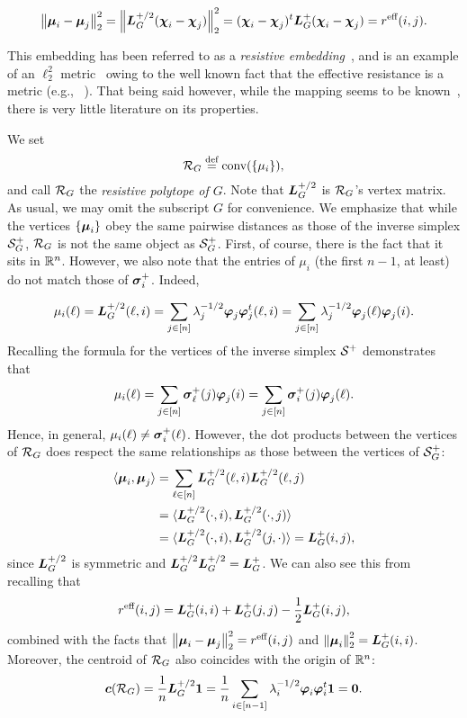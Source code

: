 \begin{equation*}
\norm{\vb*{\mu}_i-\vb*{\mu}_j}_2^2 = \norm{\vb*{L}_G^{+/2}(\boldsymbol{\chi}_i-\boldsymbol{\chi}_j)}_2^2 =  (\boldsymbol{\chi}_i-\boldsymbol{\chi}_j)^t \vb*{L}_G^+(\boldsymbol{\chi}_i-\boldsymbol{\chi}_j)=r^{\textnormal{eff}}(i,j).
\end{equation*}

This embedding has been referred to as a \emph{resistive embedding}~\cite{shayanNotes,ding2011cover}, and is an example of an $\ell_2^2$ metric~\cite{arora2009expander} owing  to the well known fact that the effective resistance is a metric (e.g., ~\cite{klein1993resistance}). That being said however, while the mapping seems to be known~\cite{ghosh2008minimizing}, there is very little literature on its properties. 

We  set 
\begin{equation}
\label{eq:res_pol}
\mathcal{R}_G \overset{\text{def}}{=} \textnormal{conv}(\{\mu_i\}),
\end{equation}
and  call  $\mathcal{R}_G$ the \emph{resistive polytope of $G$}. Note that $\vb*{L}_G^{+/2}$ is $\mathcal{R}_G$'s vertex matrix. As usual, we may omit the subscript $G$ for convenience. We emphasize that while the vertices $\{\vb*{\mu}_i\}$ obey the same pairwise  distances as  those of the inverse simplex $\mathcal{S}_G^+$, $\mathcal{R}_G$  is not the same object as $\mathcal{S}_G^+$. First, of course, there is  the fact that it sits in  $\mathbb{R}^n$. However,  we also note that the entries of $\mu_i$ (the first $n-1$, at least) do not match those of $\vb*{\sigma}_i^+$. Indeed, 

\begin{align*}
\mu_i(\ell) = \vb*{L}_G^{+/2}(\ell,i) = \sum_{j\in[n]}\lambda_j^{-1/2}\vb*{\varphi}_j\vb*{\varphi}_j^t(\ell,i) = \sum_{j\in[n]}\lambda_j^{-1/2}\vb*{\varphi}_j(\ell)\vb*{\varphi}_j(i).
\end{align*}
Recalling the formula for the vertices of the inverse simplex $\mathcal{S}^+$ demonstrates that 
\begin{equation*}
\mu_i(\ell) = \sum_{j\in[n]}\vb*{\sigma}_\ell^+(j)\vb*{\varphi}_j(i) = \sum_{j\in[n]}\vb*{\sigma}_i^+(j)\vb*{\varphi}_j(\ell).
\end{equation*}
Hence, in general, $\mu_i(\ell)\neq \vb*{\sigma}_i^+(\ell)$. However, the dot products between the vertices of $\mathcal{R}_G$ does respect  the same relationships as those between the vertices of $\mathcal{S}_G^+$:
\begin{align*}
\langle \vb*{\mu}_i,\vb*{\mu}_j\rangle &=\sum_{\ell\in[n]} \vb*{L}_G^{+/2}(\ell,i)\vb*{L}_G^{+/2}(\ell,j) \\
&= \langle \vb*{L}_G^{+/2}(\cdot,i),\vb*{L}_G^{+/2}(\cdot,j)\rangle \\
&=\langle \vb*{L}_G^{+/2}(\cdot,i),\vb*{L}_G^{+/2}(j,\cdot)\rangle= \vb*{L}_G^+(i,j),
\end{align*}
since $\vb*{L}_G^{+/2}$ is symmetric and  $\vb*{L}_G^{+/2}\vb*{L}_G^{+/2}=\vb*{L}_G^+$.  We can also see this from recalling that 
\[r^{\textnormal{eff}}(i,j) = \vb*{L}_G^+(i,i) + \vb*{L}_G^+(j,j) - \frac{1}{2}\vb*{L}_G^+(i,j),\]
combined with the facts that $\norm{\vb*{\mu}_i-\vb*{\mu}_j}_2^2 = r^{\textnormal{eff}}(i,j)$ and $\norm{\vb*{\mu}_i}_2^2 = \vb*{L}_G^+(i,i)$. Moreover, the centroid of $\mathcal{R}_G$ also coincides with the origin  of $\mathbb{R}^n$: 
\begin{equation*}
\vb*{c}(\mathcal{R}_G) = \frac{1}{n}\vb*{L}_G^{+/2}\vb{1} = \frac{1}{n}\sum_{i\in[n-1]}\lambda_i^{-1/2}\vb*{\varphi}_i\vb*{\varphi}_i^t \vb{1} = \vb{0}.
\end{equation*}

